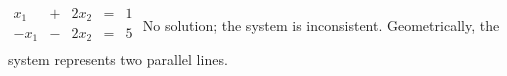 {$\begin{array}{ccccc}
x_1&+&2x_2&=&1\\
-x_1&-&2x_2&=&5\\
\end{array}$}
{No solution; the system is inconsistent. Geometrically, the system represents two parallel lines.}